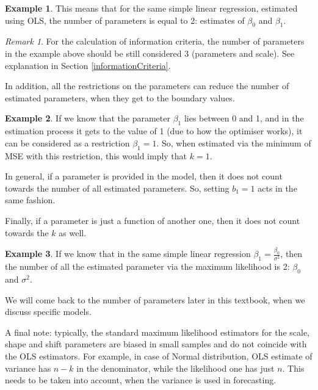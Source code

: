 \documentclass[
]{book}
\theoremstyle{definition}
\theoremstyle{definition}
\newtheorem{example}{Example}[chapter]
\theoremstyle{definition}
\theoremstyle{definition}
\theoremstyle{remark}
\newtheorem*{remark}{Remark}
\begin{document}
\begin{example}
\protect\hypertarget{exm:unnamed-chunk-127}{}\label{exm:unnamed-chunk-127}This means that for the same simple linear regression, estimated using OLS, the number of parameters is equal to 2: estimates of \(\beta_0\) and \(\beta_1\).
\end{example}

\begin{remark}
For the calculation of information criteria, the number of parameters in the example above should be still considered 3 (parameters and scale). See explanation in Section \ref{informationCriteria}.
\end{remark}

In addition, all the restrictions on the parameters can reduce the number of estimated parameters, when they get to the boundary values.

\begin{example}
\protect\hypertarget{exm:unnamed-chunk-128}{}\label{exm:unnamed-chunk-128}If we know that the parameter \(\beta_1\) lies between 0 and 1, and in the estimation process it gets to the value of 1 (due to how the optimiser works), it can be considered as a restriction \(\beta_1=1\). So, when estimated via the minimum of MSE with this restriction, this would imply that \(k=1\).
\end{example}

In general, if a parameter is provided in the model, then it does not count towards the number of all estimated parameters. So, setting \(b_1=1\) acts in the same fashion.

Finally, if a parameter is just a function of another one, then it does not count towards the \(k\) as well.

\begin{example}
\protect\hypertarget{exm:unnamed-chunk-129}{}\label{exm:unnamed-chunk-129}If we know that in the same simple linear regression \(\beta_1 = \frac{\beta_0}{\sigma^2}\), then the number of all the estimated parameter via the maximum likelihood is 2: \(\beta_0\) and \(\sigma^2\).
\end{example}

We will come back to the number of parameters later in this textbook, when we discuss specific models.

A final note: typically, the standard maximum likelihood estimators for the scale, shape and shift parameters are biased in small samples and do not coincide with the OLS estimators. For example, in case of Normal distribution, OLS estimate of variance has \(n-k\) in the denominator, while the likelihood one has just \(n\). This needs to be taken into account, when the variance is used in forecasting.
\end{document}
